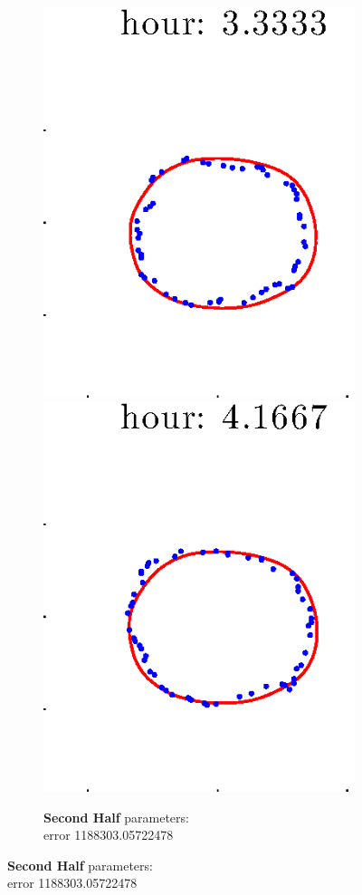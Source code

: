 \documentclass[12pt]{article}
\begin{document}
\begin{figure}[h!]
\begin{subfigure}[b]{.3\textwidth}
		\includegraphics[height=.15\textheight]{Pos10exp2/firsthalf/second5.eps}
		\includegraphics[height=.15\textheight]{Pos10exp2/firsthalf/second6.eps}
		\caption{\textbf{Second Half} parameters: \\error 1188303.05722478}
	\end{subfigure}
\end{figure}
\end{document}
